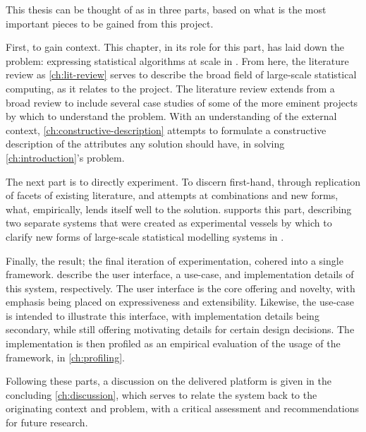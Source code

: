 This thesis can be thought of as in three parts, based on what is the most important pieces to be gained from this project.

First, to gain context.
This chapter, in its role for this part, has laid down the problem: expressing statistical algorithms at scale in \R{}.
From here, the literature review as \cref{ch:lit-review} serves to describe the broad field of large-scale statistical computing, as it relates to the \lsr{} project.
The literature review extends from a broad review to include several case studies of some of the more eminent projects by which to understand the problem.
With an understanding of the external context, \cref{ch:constructive-description} attempts to formulate a constructive description of the attributes any solution should have, in solving \cref{ch:introduction}'s problem.

The next part is to directly experiment.
To discern first-hand, through replication of facets of existing literature, and attempts at combinations and new forms, what, empirically, lends itself well to the solution.
 supports this part, describing two separate systems that were created as experimental vessels by which to clarify new forms of large-scale statistical modelling systems in \R{}.

Finally, the result; the final iteration of experimentation, cohered into a single \lsr{} framework.
 describe the user interface, a use-case, and implementation details of this system, respectively.
The user interface is the core offering and novelty, with emphasis being placed on expressiveness and extensibility.
Likewise, the use-case is intended to illustrate this interface, with implementation details being secondary, while still offering motivating details for certain design decisions.
The implementation is then profiled as an empirical evaluation of the usage of the framework, in \cref{ch:profiling}.

Following these parts, a discussion on the delivered platform is given in the concluding \cref{ch:discussion}, which serves to relate the \lsr{} system back to the originating context and problem, with a critical assessment and recommendations for future research.
